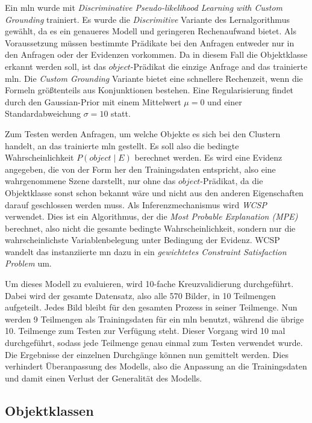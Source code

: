 Ein \gls{mln} wurde mit \textit{Discriminative Pseudo-likelihood Learning with Custom Grounding} trainiert. Es wurde die \textit{Discrimitive} Variante des Lernalgorithmus gewählt, da es ein genaueres Modell und geringeren Rechenaufwand bietet. Als Voraussetzung müssen bestimmte Prädikate bei den Anfragen entweder nur in den Anfragen oder der Evidenzen vorkommen. Da in diesem Fall die Objektklasse erkannt werden soll, ist das $object$-Prädikat die einzige Anfrage and das trainierte \gls{mln}. Die \textit{Custom Grounding} Variante bietet eine schnellere Rechenzeit, wenn die Formeln größtenteils aus Konjunktionen bestehen. Eine Regularisierung findet durch den Gaussian-Prior mit einem Mittelwert $\mu = 0$ und einer Standardabweichung $\sigma = 10$ statt. \par   

Zum Testen werden Anfragen, um welche Objekte es sich bei den Clustern handelt, an das trainierte \gls{mln} gestellt. Es soll also die bedingte Wahrscheinlichkeit $P(object \mid E)$ berechnet werden. Es wird eine Evidenz angegeben, die von der Form her den Trainingsdaten entspricht, also eine wahrgenommene Szene darstellt, nur ohne das $object$-Prädikat, da die Objektklasse sonst schon bekannt wäre und nicht aus den anderen Eigenschaften darauf geschlossen werden muss. Als Inferenzmechanismus wird \textit{WCSP} verwendet. Dies ist ein Algorithmus, der die \textit{Most Probable Explanation (MPE)} berechnet, also nicht die gesamte bedingte Wahrscheinlichkeit, sondern nur die wahrscheinlichste Variablenbelegung unter Bedingung der Evidenz. WCSP wandelt das instanziierte \gls{mn} dazu in ein \textit{gewichtetes Constraint Satisfaction Problem} um. \par

Um dieses Modell zu evaluieren, wird 10-fache Kreuzvalidierung durchgeführt. Dabei wird der gesamte Datensatz, also alle 570 Bilder, in 10 Teilmengen aufgeteilt. Jedes Bild bleibt für den gesamten Prozess in seiner Teilmenge. Nun werden 9 Teilmengen als Trainingsdaten für ein \gls{mln} benutzt, während die übrige 10. Teilmenge zum Testen zur Verfügung steht. Dieser Vorgang wird 10 mal durchgeführt, sodass jede Teilmenge genau einmal zum Testen verwendet wurde. Die Ergebnisse der einzelnen Durchgänge können nun gemittelt werden. Dies verhindert Überanpassung des Modells, also die Anpassung an die Trainingsdaten und damit einen Verlust der Generalität des Modells. 

\subsection{Objektklassen}

